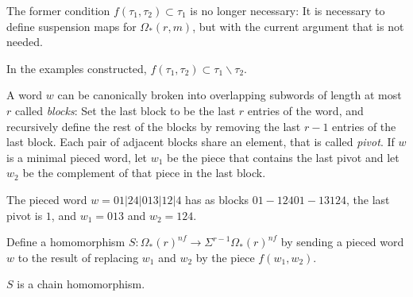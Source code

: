 \begin{remark}
	The former condition $f(\tau_1,\tau_2)\subset \tau_1$ is no longer necessary: It is necessary to define suspension maps for $\Omega_*(r,m)$, but with the current argument that is not needed.
\end{remark}

\begin{remark}
	In the examples constructed, $f(\tau_1,\tau_2)\subset \tau_1\smallsetminus \tau_2$.
\end{remark}

A word $w$ can be canonically broken into overlapping subwords of length at most $r$ called \emph{blocks}: Set the last block to be the last $r$ entries of the word, and recursively define the rest of the blocks by removing the last $r-1$ entries of the last block. Each pair of adjacent blocks share an element, that is called \emph{pivot}. If $w$ is a minimal pieced word, let $w_1$ be the piece that contains the last pivot and let $w_2$ be the complement of that piece in the last block.

\begin{example}
	The pieced word $w=01|24|013|12|4$ has as blocks $01-12401-13124$, the last pivot is $1$, and $w_1 = 013$ and $w_2 = 124$.
\end{example}

\begin{definition}
	Define a homomorphism $S\colon \Omega_*(r)^{nf}\to \Sigma^{r-1}\Omega_*(r)^{nf}$ by sending a pieced word $w$ to the result of replacing $w_1$ and $w_2$ by the piece $f(w_1,w_2)$. %
\end{definition}

\begin{lemma}
	$S$ is a chain homomorphism.
\end{lemma}

